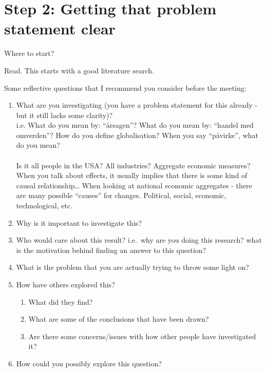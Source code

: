 \documentclass[
]{book}
\begin{document}
\hypertarget{step-2-getting-that-problem-statement-clear}{%
\section{Step 2: Getting that problem statement clear}\label{step-2-getting-that-problem-statement-clear}}

Where to start?

Read. This starts with a good literature search.

Some reflective questions that I recommend you consider before the meeting:

\begin{enumerate}
\def\labelenumi{\arabic{enumi}.}
\item
  What are you investigating (you have a problem statement for this already - but it still lacks some clarity)?\\
  i.e.
  What do you mean by: ``årsagen''?
  What do you mean by: ``handel med omverden''?
  How do you define globalisation?
  When you say ``påvirke'', what do you mean?\\
  ~\\
  Is it all people in the USA? All industries? Aggregate economic measures?\\
  When you talk about effects, it usually implies that there is some kind of causal relationship\ldots{} When looking at national economic aggregates - there are many possible ``causes'' for changes. Political, social, economic, technological, etc.
\item
  Why is it important to investigate this?
\item
  Who would care about this result? i.e.~why are you doing this research? what is the motivation behind finding an answer to this question?
\item
  What is the problem that you are actually trying to throw some light on?
\item
  How have others explored this?

  \begin{enumerate}
  \def\labelenumii{\arabic{enumii}.}
  \item
    What did they find?
  \item
    What are some of the conclusions that have been drawn?
  \item
    Are there some concerns/issues with how other people have investigated it?
  \end{enumerate}
\item
  How could you possibly explore this question?


\end{enumerate}
\end{document}
